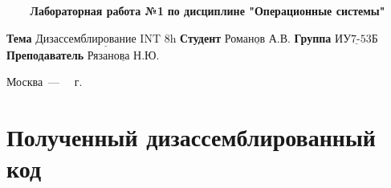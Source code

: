 \documentclass[a4paper,12pt]{article}
\begin{document}
\begin{center}
	\noindent\begin{minipage}{1.3\textwidth}\centering
	\Large\textbf{   ~~~ Лабораторная работа №1}\newline
	\textbf{по дисциплине "Операционные системы"}\newline\newline\newline
	\end{minipage}
\end{center}

\noindent\textbf{Тема} $\underline{\text{Дизассемблирование INT 8h}}$\newline\newline
\noindent\textbf{Студент} $\underline{\text{Романов А.В.}}$\newline\newline
\noindent\textbf{Группа} $\underline{\text{ИУ7-53Б}}$\newline\newline
\noindent\textbf{Преподаватель} $\underline{\text{Рязанова Н.Ю.}}$\newline

\begin{center}
	\vfill
	Москва~---~\the\year
~г.
\end{center}
\clearpage

\section{Полученный дизассемблированный код}
\end{document}
